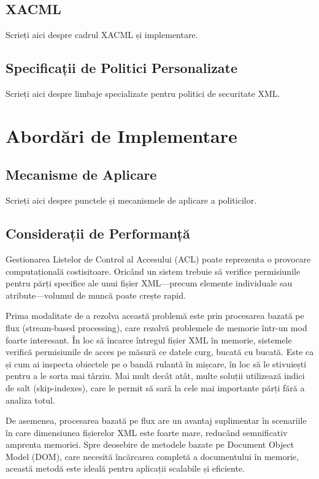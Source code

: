 \documentclass[runningheads]{llncs}
\begin{document}
\begin{spacing}{1.5}
\subsection{XACML}
Scrieți aici despre cadrul XACML și implementare.

\subsection{Specificații de Politici Personalizate}
Scrieți aici despre limbaje specializate pentru politici de securitate XML.

\section{Abordări de Implementare}

\subsection{Mecanisme de Aplicare}
Scrieți aici despre punctele și mecanismele de aplicare a politicilor.

\subsection{Considerații de Performanță}
Gestionarea Listelor de Control al Accesului (ACL) poate reprezenta o provocare computațională costisitoare. Oricând un sistem trebuie să verifice permisiunile pentru părți specifice ale unui fișier XML—precum elemente individuale sau atribute—volumul de muncă poate crește rapid.

Prima modalitate de a rezolva această problemă este prin procesarea bazată pe flux (stream-based processing), care rezolvă problemele de memorie într-un mod foarte interesant. În loc să încarce întregul fișier XML în memorie, sistemele verifică permisiunile de acces pe măsură ce datele curg, bucată cu bucată. Este ca și cum ai inspecta obiectele pe o bandă rulantă în mișcare, în loc să le stivuiești pentru a le sorta mai târziu. Mai mult decât atât, multe soluții utilizează indici de salt (skip-indexes), care le permit să sară la cele mai importante părți fără a analiza totul.

De asemenea, procesarea bazată pe flux are un avantaj suplimentar în scenariile în care dimensiunea fișierelor XML este foarte mare, reducând semnificativ amprenta memoriei. Spre deosebire de metodele bazate pe Document Object Model (DOM), care necesită încărcarea completă a documentului în memorie, această metodă este ideală pentru aplicații scalabile și eficiente.


\end{spacing}
\end{document}
